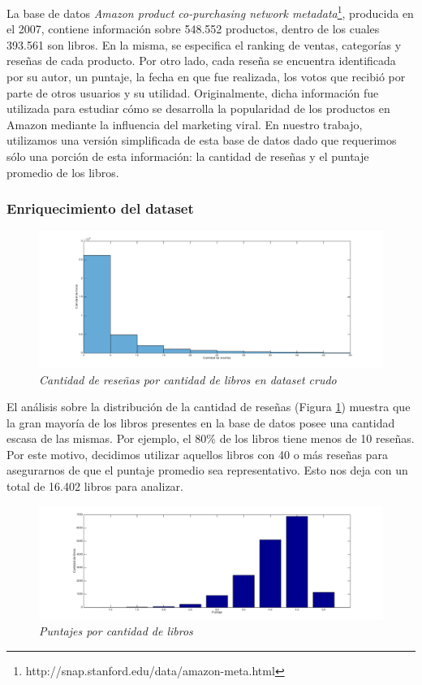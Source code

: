 \documentclass[12pt,journal,compsoc]{IEEEtran}
\begin{document}
La base de datos \textit{Amazon product co-purchasing network metadata}\footnote{http://snap.stanford.edu/data/amazon-meta.html}, producida en el 2007, contiene información sobre 548.552 productos, dentro de los cuales 393.561 son libros. En la misma, se especifica el ranking de ventas, categorías y reseñas de cada producto. Por otro lado, cada reseña se encuentra identificada por su autor, un puntaje, la fecha en que fue realizada, los votos que recibió por parte de otros usuarios y su utilidad. Originalmente, dicha información fue utilizada para estudiar cómo se desarrolla la popularidad de los productos en Amazon mediante la influencia del marketing viral\cite{leskovec}. En nuestro trabajo, utilizamos una versión simplificada de esta base de datos dado que requerimos sólo una porción de esta información: la cantidad de reseñas y el puntaje promedio de los libros.

\subsubsection{Enriquecimiento del dataset}
\begin{figure}[H]
  \centering
  \includegraphics[width=7.5in]{imgs/cantResenasVsCantLibros.png}
  \caption{\small \textit{Cantidad de reseñas por cantidad de libros en dataset crudo}}
  \label{fig:cantResVsCantLibros}
\end{figure} 

El análisis sobre la distribución de la cantidad de reseñas (Figura \ref{fig:cantResVsCantLibros}) muestra que la gran mayoría de los libros presentes en la base de datos posee una cantidad escasa de las mismas. Por ejemplo, el 80\% de los libros tiene menos de 10 reseñas. Por este motivo, decidimos utilizar aquellos libros con 40 o más reseñas para asegurarnos de que el puntaje promedio sea representativo. Esto nos deja con un total de 16.402 libros para analizar.

\begin{figure}[H]
  \centering
  \includegraphics[width=7.5in]{imgs/cantidadDeLibrosVsPuntaje.png}
  \caption{\small \textit{Puntajes por cantidad de libros}}
  \label{fig:cantLibrosVsPuntaje}
\end{figure} 
\end{document}
